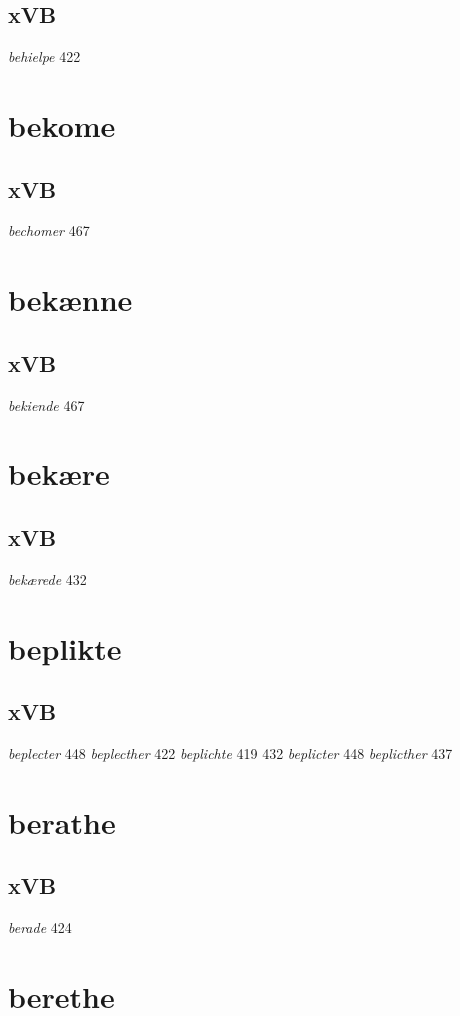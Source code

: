 \documentclass[a4paper,twocolumn]{article}
\begin{document}
\subsection{xVB}
\label{sec:org5ce283d}
\emph{behielpe} 422 
\section{bekome}
\label{sec:orgd2eecc8}
\subsection{xVB}
\label{sec:org65dd1df}
\emph{bechomer} 467 
\section{bekænne}
\label{sec:orgce8ee81}
\subsection{xVB}
\label{sec:orgaca22bc}
\emph{bekiende} 467 
\section{bekære}
\label{sec:org0b05944}
\subsection{xVB}
\label{sec:org007dd81}
\emph{bekærede} 432 
\section{beplikte}
\label{sec:orgdcf6635}
\subsection{xVB}
\label{sec:orgcd149eb}
\emph{beplecter} 448 \emph{beplecther} 422 \emph{beplichte} 419 432 \emph{beplicter} 448 \emph{beplicther} 437 
\section{berathe}
\label{sec:org0cc636b}
\subsection{xVB}
\label{sec:org65aa7b1}
\emph{berade} 424 
\section{berethe}
\label{sec:org83714c6}
\end{document}
